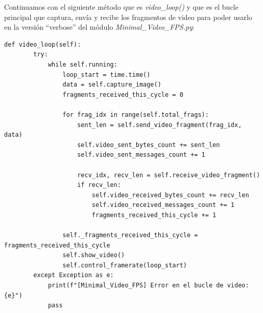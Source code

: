 Continuamos con el siguiente método que es \textit{video\_loop()} y que es el bucle principal que captura, envía y recibe los fragmentos de video para poder usarlo en la versión ``verbose'' del módulo \textit{Minimal\_Video\_FPS.py}:
\begin{lstlisting}[style=pythonstyle, caption={Método video\_loop()}, label={lst:video_loop_verbose}]
def video_loop(self):
        try:
            while self.running:
                loop_start = time.time()
                data = self.capture_image()
                fragments_received_this_cycle = 0

                for frag_idx in range(self.total_frags):
                    sent_len = self.send_video_fragment(frag_idx, data)
                    self.video_sent_bytes_count += sent_len
                    self.video_sent_messages_count += 1

                    recv_idx, recv_len = self.receive_video_fragment()
                    if recv_len:
                        self.video_received_bytes_count += recv_len
                        self.video_received_messages_count += 1
                        fragments_received_this_cycle += 1

                self._fragments_received_this_cycle = fragments_received_this_cycle
                self.show_video()
                self.control_framerate(loop_start)
        except Exception as e:
            print(f"[Minimal_Video_FPS] Error en el bucle de video: {e}")
            pass
\end{lstlisting}
\vspace{\baselineskip}

